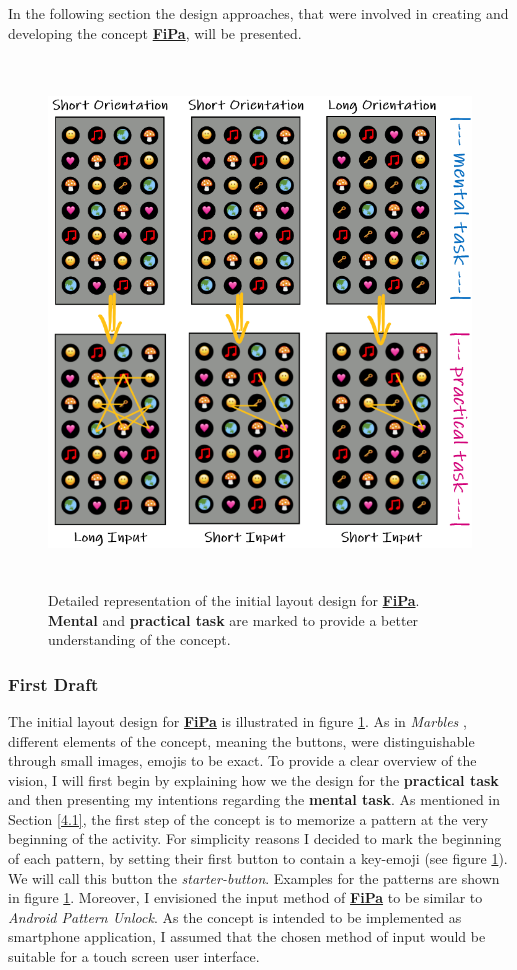 In the following section the design approaches, that were involved in creating and developing the concept \underline{\textbf{FiPa}}, will be presented.

\begin{figure}[t!]
\centering
\includegraphics[width=14cm, height=14cm]{Chapters/graphics/firstdraft.PNG}
\caption{Detailed representation of the initial layout design for \underline{\textbf{FiPa}}. \textbf{Mental} and \textbf{practical task} are marked to provide a better understanding of the concept.}
\label{fig:firstdraft}
\end{figure}

\subsubsection{First Draft} \label{4.2.2.1}
The initial layout design for \underline{\textbf{FiPa}} is illustrated in figure \ref{fig:firstdraft}. As in \textit{Marbles} \cite{Marbles, Zezschwitz}, different elements of the concept, meaning the buttons, were distinguishable through small images, emojis to be exact. To provide a clear overview of the vision, I will first begin by explaining how we the design for the \textbf{practical task} and then presenting my intentions regarding the \textbf{mental task}. As mentioned in Section \ref{4.1}, the first step of the concept is to memorize a pattern at the very beginning of the activity. For simplicity reasons I decided to mark the beginning of each pattern, by setting their first button to contain a key-emoji (see figure \ref{fig:firstdraft}). We will call this button the \textit{starter-button}. Examples for the patterns are shown in figure \ref{fig:firstdraft}. Moreover, I envisioned the input method of \underline{\textbf{FiPa}} to be similar to \textit{Android Pattern Unlock}. As the concept is intended to be implemented as smartphone application, I assumed that the chosen method of input would be suitable for a touch screen user interface. \\

